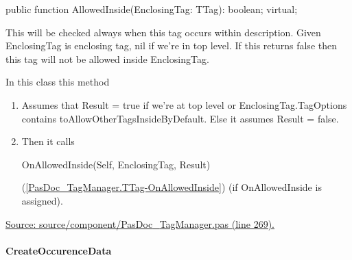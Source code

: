 \documentclass{report}
\newif\ifpdf
\begin{document}
\label{PasDoc_TagManager.TTag-AllowedInside}
\begin{list}{}{
\setlength{\itemindent}{0cm}
\setlength{\listparindent}{0cm}
\setlength{\leftmargin}{\evensidemargin}
\addtolength{\leftmargin}{\tmplength}
\settowidth{\labelsep}{X}
\addtolength{\leftmargin}{\labelsep}
\setlength{\labelwidth}{\tmplength}
}
\item[\textbf{Declaration}\hfill]
\ifpdf
\begin{flushleft}
\fi
\begin{ttfamily}
public function AllowedInside(EnclosingTag: TTag): boolean; virtual;\end{ttfamily}

\ifpdf
\end{flushleft}
\fi

\par
\item[\textbf{Description}]
This will be checked always when this tag occurs within description. Given EnclosingTag is enclosing tag, nil if we're in top level. If this returns false then this tag will not be allowed inside EnclosingTag.

In this class this method \begin{enumerate}
\setcounter{enumi}{0} \setcounter{enumii}{0} \setcounter{enumiii}{0} \setcounter{enumiv}{0} 
\item  Assumes that Result = true if we're at top level or EnclosingTag.TagOptions contains toAllowOtherTagsInsideByDefault. Else it assumes Result = false.
\setcounter{enumi}{1} \setcounter{enumii}{1} \setcounter{enumiii}{1} \setcounter{enumiv}{1} 
\item  Then it calls \begin{ttfamily}OnAllowedInside(Self, EnclosingTag, Result)\end{ttfamily}(\ref{PasDoc_TagManager.TTag-OnAllowedInside}) (if OnAllowedInside is assigned).
\end{enumerate}\par
\href{https://github.com/pasdoc/pasdoc/blob/master/source/component/PasDoc_TagManager.pas#L269}{Source: source/component/PasDoc{\_}TagManager.pas (line 269).}

\end{list}
\paragraph*{CreateOccurenceData}\hspace*{\fill}
\end{document}
